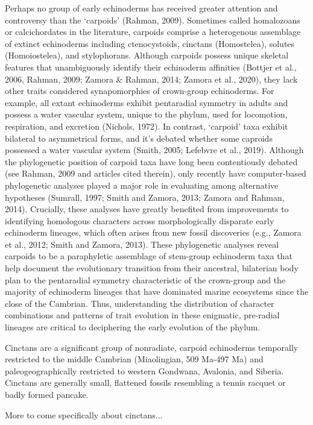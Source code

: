 \documentclass{article}
\begin{document}
Perhaps no group of early echinoderms has received greater attention and controversy than the ‘carpoids’ (Rahman, 2009). Sometimes called homalozoans or calcichordates in the literature, carpoids comprise a heterogenous assemblage of extinct echinoderms including ctenocystoids, cinctans (Homostelea), solutes (Homoiostelea), and stylophorans. Although carpoids possess unique skeletal features that unambiguously identify their echinoderm affinities (Bottjer et al., 2006, Rahman, 2009; Zamora & Rahman, 2014; Zamora et al., 2020), they lack other traits considered synapomorphies of crown-group echinoderms. For example, all extant echinoderms exhibit pentaradial symmetry in adults and possess a water vascular system, unique to the phylum, used for locomotion, respiration, and excretion (Nichols, 1972).  In contrast, ‘carpoid’ taxa exhibit bilateral to asymmetrical forms, and it’s debated whether some caproids possessed a water vascular system (Smith, 2005; Lefebvre et al., 2019). Although the phylogenetic position of carpoid taxa have long been contentiously debated (see Rahman, 2009 and articles cited therein), only recently have computer-based phylogenetic analyses played a major role in evaluating among alternative hypotheses (Sumrall, 1997; Smith and Zamora, 2013; Zamora and Rahman, 2014). Crucially, these analyses have greatly benefited from improvements to identifying homologous characters across morphologically disparate early echinoderm lineages, which often arises from new fossil discoveries (e.g., Zamora et al., 2012; Smith and Zamora, 2013). These phylogenetic analyses reveal carpoids to be a paraphyletic assemblage of stem-group echinoderm taxa that help document the evolutionary transition from their ancestral, bilaterian body plan to the pentaradial symmetry characteristic of the crown-group and the majority of echinoderm lineages that have dominated marine ecosystems since the close of the Cambrian. Thus, understanding the distribution of character combinations and patterns of trait evolution in these enigmatic, pre-radial lineages are critical to deciphering the early evolution of the phylum.

Cinctans are a significant group of nonradiate, carpoid echinoderms temporally restricted to the middle Cambrian (Miaolingian, 509 Ma-497 Ma) and paleogeographically restricted to western Gondwana, Avalonia, and Siberia. Cinctans are generally small, flattened fossils resembling a tennis racquet or badly formed pancake.


More to come specifically about cinctans... 
\end{document}
